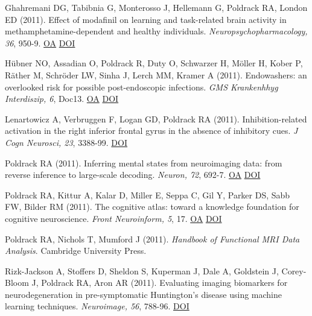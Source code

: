 Ghahremani DG, Tabibnia G, Monterosso J, Hellemann G, Poldrack RA, London ED (2011). Effect of modafinil on learning and task-related brain activity in methamphetamine-dependent and healthy individuals. \textit{Neuropsychopharmacology, 36}, 950-9. \href{https://www.ncbi.nlm.nih.gov/pmc/articles/PMC3077264}{OA} \href{http://dx.doi.org/10.1038/npp.2010.233}{DOI} \vspace{2mm}

Hübner NO, Assadian O, Poldrack R, Duty O, Schwarzer H, Möller H, Kober P, Räther M, Schröder LW, Sinha J, Lerch MM, Kramer A (2011). Endowashers: an overlooked risk for possible post-endoscopic infections. \textit{GMS Krankenhhyg Interdiszip, 6}, Doc13. \href{https://www.ncbi.nlm.nih.gov/pmc/articles/PMC3252647}{OA} \href{http://dx.doi.org/10.3205/dgkh000170}{DOI} \vspace{2mm}

Lenartowicz A, Verbruggen F, Logan GD, Poldrack RA (2011). Inhibition-related activation in the right inferior frontal gyrus in the absence of inhibitory cues. \textit{J Cogn Neurosci, 23}, 3388-99. \href{http://dx.doi.org/10.1162/jocn\_a\_00031}{DOI} \vspace{2mm}

Poldrack RA (2011). Inferring mental states from neuroimaging data: from reverse inference to large-scale decoding. \textit{Neuron, 72}, 692-7. \href{https://www.ncbi.nlm.nih.gov/pmc/articles/PMC3240863}{OA} \href{http://dx.doi.org/10.1016/j.neuron.2011.11.001}{DOI} \vspace{2mm}

Poldrack RA, Kittur A, Kalar D, Miller E, Seppa C, Gil Y, Parker DS, Sabb FW, Bilder RM (2011). The cognitive atlas: toward a knowledge foundation for cognitive neuroscience. \textit{Front Neuroinform, 5}, 17. \href{https://www.ncbi.nlm.nih.gov/pmc/articles/PMC3167196}{OA} \href{http://dx.doi.org/10.3389/fninf.2011.00017}{DOI} \vspace{2mm}

Poldrack RA, Nichols T, Mumford J (2011).  \textit{Handbook of Functional MRI Data Analysis}. Cambridge University Press. \vspace{2mm}

Rizk-Jackson A, Stoffers D, Sheldon S, Kuperman J, Dale A, Goldstein J, Corey-Bloom J, Poldrack RA, Aron AR (2011). Evaluating imaging biomarkers for neurodegeneration in pre-symptomatic Huntington's disease using machine learning techniques. \textit{Neuroimage, 56}, 788-96. \href{http://dx.doi.org/10.1016/j.neuroimage.2010.04.273}{DOI} \vspace{2mm}

